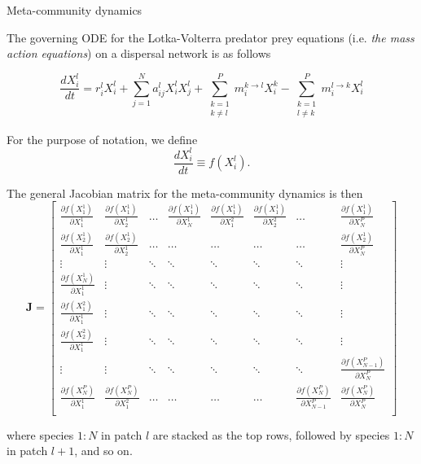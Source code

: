 \documentclass[12pt]{article}
\begin{document}
Meta-community dynamics

The governing ODE for the Lotka-Volterra predator prey equations (i.e. \textit{the mass action equations}) on a dispersal network is as follows 

\[ \frac{dX_{i}^{l}}{dt} = r_i^l X_i^l 
		 + \sum_{j=1}^{N}a_{ij}^{l}X_{i}^{l}X_{j}^{l} 
		 + \sum_{\substack{k=1\\k \neq l}}^{P}m_{i}^{k \rightarrow l}X_{i}^{k}		
		 -  \sum_{\substack{k=1\\l \neq k}}^{P}m_{i}^{l \rightarrow k} X_{i}^{l} \] 


For the purpose of notation, we define
\[ \frac{dX_{i}^{l}}{dt} \equiv f(X_{i}^{l}). \]

The general Jacobian matrix for the meta-community dynamics is then
\[ \mathbf{J} = \begin{bmatrix}
    \frac{\partial f(X_1^1)}{\partial X_1^1} & \frac{\partial f(X_1^1)}{\partial X_2^1} & \dots & \frac{\partial f(X_1^1)}{\partial X_N^1}  &  \frac{\partial f(X_1^1)}{\partial X_1^2} & \frac{\partial f(X_1^1)}{\partial X_2^2} & \dots & \frac{\partial f(X_1^1)}{\partial X_N^{P}} \\ 
    \frac{\partial f(X_2^1)}{\partial X_1^1} &  \frac{\partial f(X_2^1)}{\partial X_2^1} & \dots & \dots & \dots & \dots & \dots & \frac{\partial f(X_2^1)}{\partial X_N^P} \\
    \vdots    & \vdots & \ddots  & \ddots & \ddots & \ddots & \ddots & \vdots\\
    \frac{\partial f(X_N^1)}{\partial X_1^1} & \vdots   & \ddots  & \ddots & \ddots & \ddots & \ddots & \vdots \\
    \frac{\partial f(X_1^2)}{\partial X_1^1} & \vdots & \ddots  & \ddots & \ddots & \ddots & \ddots & \vdots \\
    \frac{\partial f(X_2^2)}{\partial X_1^1} & \vdots & \ddots  & \ddots & \ddots & \ddots & \ddots & \vdots\\
    \vdots   & \vdots & \ddots  & \ddots & \ddots & \ddots & \ddots & \frac{\partial f(X_{N-1}^P)}{\partial X_N^P}\\
    \frac{\partial f(X_N^P)}{\partial X_1^1} & \frac{\partial f(X_N^P)}{\partial X_1^2} & \dots & \dots & \dots & \dots & \frac{\partial f(X_N^P)}{\partial X_{N-1}^P} & \frac{\partial f(X_N^P)}{\partial X_N^P} \\    
\end{bmatrix} \]

where species $1:N$ in patch $l$ are stacked as the top rows, followed by species $1:N$ in patch $l+1$, and so on. 
\end{document}
